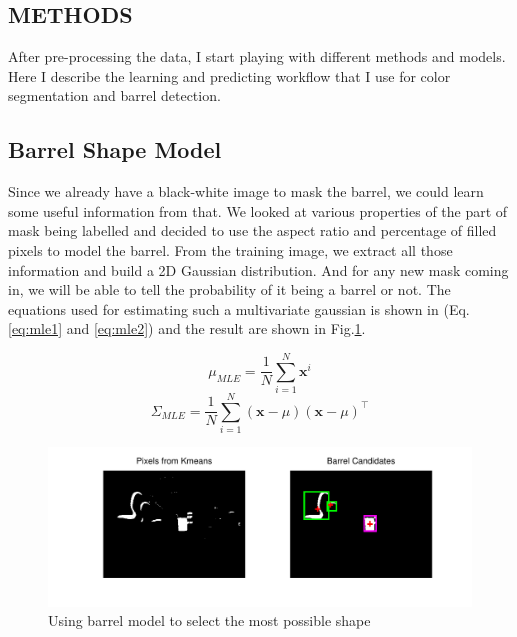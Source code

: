 \documentclass[twoside]{article}
\begin{document}
\begin{multicols}{2}

\section{METHODS}
After pre-processing the data, I start playing with different methods and models. Here I describe the learning and predicting workflow that I use for color segmentation and barrel detection.

\subsection{Barrel Shape Model}
Since we already have a black-white image to mask the barrel, we could learn some useful information from that. We looked at various properties of the part of mask being labelled and decided to use the aspect ratio and percentage of filled pixels to model the barrel. From the training image, we extract all those information and build a 2D Gaussian distribution. And for any new mask coming in, we will be able to tell the probability of it being a barrel or not. The equations used for estimating such a multivariate gaussian is shown in (Eq.\ref{eq:mle1} and \ref{eq:mle2}) and the result are shown in Fig.\ref{fig:barrel_model}.

\begin{equation}
\mu_{MLE} = \frac{1}{N}\sum_{i=1}^N\mathbf{x}^i
\label{eq:mle1}
\end{equation}
\begin{equation}
\Sigma_{MLE} = \frac{1}{N}\sum_{i=1}^N(\mathbf{x}-\mu)(\mathbf{x}-\mu)^{\top}
\label{eq:mle2}
\end{equation}

\begin{figure}[H]
  \centering
  \includegraphics[width=\columnwidth]{barrel_model.pdf}
    \caption{Using barrel model to select the most possible shape}
    \label{fig:barrel_model}
\end{figure}



\end{multicols}
\end{document}
